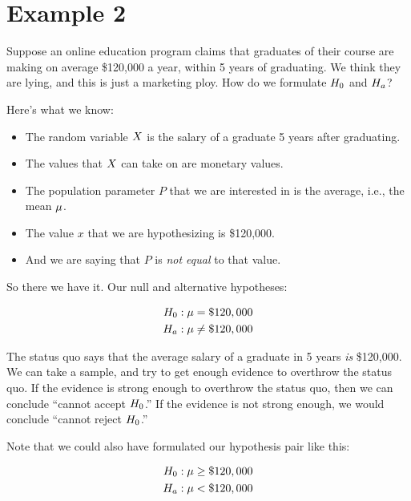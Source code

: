 \documentclass[../../../main.tex]{subfiles}
\begin{document}
\section{Example 2}

Suppose an online education program claims that graduates of their course are making on average \$120,000 a year, within 5 years of graduating. We think they are lying, and this is just a marketing ploy. How do we formulate $\NullHyp/$ and $\AltHyp/$?

Here's what we know:

\begin{itemize}
  \item The random variable $\RandVar/$ is the salary of a graduate 5 years after graduating.
  \item The values that $\RandVar/$ can take on are monetary values.
  \item The population parameter $P$ that we are interested in is the average, i.e., the mean $\mu$.
  \item The value $x$ that we are hypothesizing is \$120,000.
  \item And we are saying that $P$ is \emph{not equal} to that value.
\end{itemize}

\noindent
So there we have it. Our null and alternative hypotheses:

\begin{align*}
  \NullHyp/: \populationmean = \$120,000 \\
  \AltHyp/: \populationmean \not = \$120,000
\end{align*}

\noindent
The status quo says that the average salary of a graduate in 5 years \emph{is} \$120,000. We can take a sample, and try to get enough evidence to overthrow the status quo. If the evidence is strong enough to overthrow the status quo, then we can conclude ``cannot accept $\NullHyp/$.'' If the evidence is not strong enough, we would conclude ``cannot reject $\NullHyp/$.''

Note that we could also have formulated our hypothesis pair like this:

\begin{align*}
  \NullHyp/: \populationmean \geq \$120,000 \\
  \AltHyp/: \populationmean < \$120,000
\end{align*}
\end{document}
